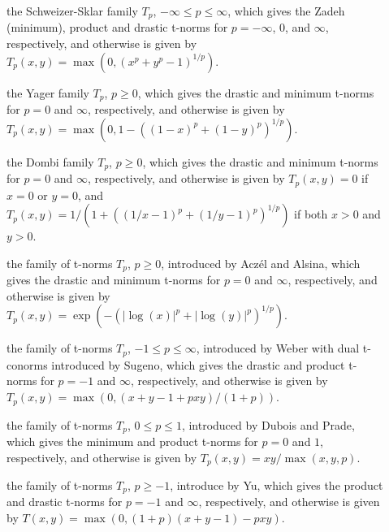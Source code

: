 \documentclass[article]{jss}
\newcommand{\eqn}[1]{$#1$}
\begin{document}
\begin{appendix}
  \begin{description}
  \item[]{the Schweizer-Sklar family
      \eqn{T_p}, \eqn{-\infty \le p \le \infty}, which
      gives the Zadeh (minimum), product and drastic t-norms for
      \eqn{p = -\infty}, \eqn{0}, and \eqn{\infty},
      respectively, and otherwise is given by
      \eqn{T_p(x, y) = \max(0, (x^p + y^p - 1)^{1/p})}.}
  \item[]{the Yager family \eqn{T_p}, \eqn{p \ge 0},
      which gives the drastic and minimum t-norms for \eqn{p = 0}
      and \eqn{\infty}, respectively, and otherwise is given by
      \eqn{T_p(x, y) = \max(0, 1 - ((1-x)^p + (1-y)^p)^{1/p})}.}
  \item[]{the Dombi family \eqn{T_p}, \eqn{p \ge 0},
      which gives the drastic and minimum t-norms for \eqn{p = 0}
      and \eqn{\infty}, respectively, and otherwise is given by
      \eqn{T_p(x, y) = 0} if \eqn{x = 0} or \eqn{y = 0}, and
      \eqn{T_p(x, y) = 1 / (1 + ((1/x - 1)^p + (1/y - 1)^p)^{1/p})} if
      both \eqn{x > 0} and \eqn{y > 0}.}
  \item[]{the family of t-norms \eqn{T_p},
      \eqn{p \ge 0}, introduced by Acz{\'e}l and Alsina, which gives the
      drastic and minimum t-norms for \eqn{p = 0} and
      \eqn{\infty}, respectively, and otherwise is given by
      \eqn{T_p(x, y) = \exp(-(|\log(x)|^p + |\log(y)|^p)^{1/p})}.}
  \item[]{the family of t-norms \eqn{T_p},
      \eqn{-1 \le p \le \infty}, introduced by Weber
      with dual t-conorms introduced by Sugeno, which gives the
      drastic and product t-norms for \eqn{p = -1} and
      \eqn{\infty}, respectively, and otherwise is given by
      \eqn{T_p(x, y) = \max(0, (x + y - 1 + pxy) / (1 + p))}.}
  \item[]{the family of t-norms \eqn{T_p},
      \eqn{0 \le p \le 1}, introduced by Dubois and Prade, which gives
      the minimum and product t-norms for \eqn{p = 0} and \eqn{1},
      respectively, and otherwise is given by
      \eqn{T_p(x, y) = xy / \max(x, y, p)}.}
  \item[]{the family of t-norms \eqn{T_p}, \eqn{p \ge -1},
      introduce by Yu, which gives the product and drastic t-norms for
      \eqn{p = -1} and \eqn{\infty}, respectively, and otherwise is
      given by \eqn{T(x, y) = \max(0, (1 + p) (x + y - 1) - p x y)}.}
  \end{description}

\end{appendix}


\end{document}
